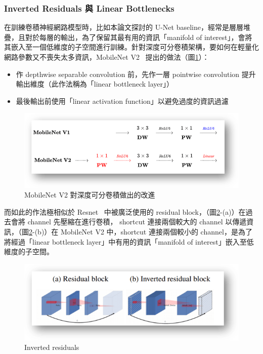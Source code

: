 \subsubsection{Inverted Residuals 與 Linear Bottlenecks}
在訓練卷積神經網路模型時，比如本論文探討的 U-Net baseline，經常是層層堆疊，且對於每層的輸出，為了保留其最有用的資訊「manifold of interest」，會將其嵌入至一個低維度的子空間進行訓練。針對深度可分卷積架構，要如何在輕量化網路參數又不喪失太多資訊，MobileNet V2~\cite{sandler2018mobilenetv2} 提出的做法（圖\ref{inverted_residuals1}）：
\begin{itemize}
    \item[1.] 作 depthwise separable convolution 前，先作一層 pointwise convolution 提升輸出維度（此作法稱為「linear bottleneck layer」）
    \item[2.] 最後輸出前使用「linear activation function」以避免過度的資訊過濾
\end{itemize}
\begin{figure}[htbp]
    \hfil
    \begin{minipage}[t]{0.65\textwidth}
        \includegraphics[width=\textwidth]{./figures/chapter02_method/inverted_residuals1.png}
        \caption {MobileNet V2 對深度可分卷積做出的改進}
        \label{inverted_residuals1}
    \end{minipage}
    \hfil
\end{figure}
而如此的作法極相似於 Resnet~\cite{he2016deep} 中被廣泛使用的 residual block，（圖\ref{inverted_residuals2}-(a)）在過去會將 channel 先壓縮在進行卷積， shortcut 連接兩個較大的 channel 以傳遞資訊，（圖\ref{inverted_residuals2}-(b)）在 MobileNet V2 中，shortcut 連接兩個較小的 channel，是為了將經過「linear bottleneck layer」中有用的資訊「manifold of interest」嵌入至低維度的子空間。
\begin{figure}[htbp]
    \hfil
    \begin{minipage}[t]{0.65\textwidth}
        \includegraphics[width=\textwidth]{./figures/chapter02_method/inverted_residuals2.png}
        \caption {Inverted residuals}
        \label{inverted_residuals2}
    \end{minipage}
    \hfil
\end{figure}


